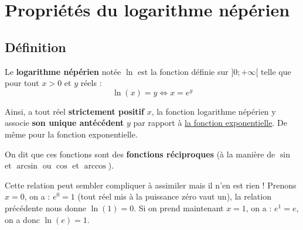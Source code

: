 


	
	
	

	\section{Propriétés du logarithme népérien}

	\subsection{Définition}

	\begin{formula}[Définition]
		Le \textbf{logarithme népérien} notée $\ln$ est la fonction définie sur $]0;+\infty[$ telle que pour tout $x > 0$ et $y$ réels :
		\[ \ln(x) = y \iff x = e^y \]
	\end{formula}

	Ainsi, a tout réel \textbf{strictement positif} $x$, la fonction logarithme népérien y associe \textbf{son unique antécédent} $y$ par rapport à \href{https://bacomathiqu.es/cours/premiere/fonction-exponentielle/}{la fonction exponentielle}. De même pour la fonction exponentielle.

	On dit que ces fonctions sont des \textbf{fonctions réciproques} (à la manière de $\sin$ et $\arcsin$ ou $\cos$ et $\arccos$).

	\begin{tip}[Exemple]
		Cette relation peut sembler compliquer à assimiler mais il n'en est rien ! Prenons $x = 0$, on a :
		\newpar
		$e^0 = 1$ (tout réel mis à la puissance zéro vaut un), la relation précédente nous donne $\ln(1) = 0$.
		\newpar
		Si on prend maintenant $x = 1$, on a :
		\newpar
		$e^1 = e$, on a donc $\ln(e) = 1$.
	\end{tip}

